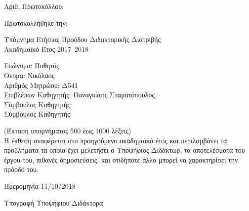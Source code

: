 \documentclass[a4paper]{article}
\begin{document}

Αριθ. Πρωτοκόλλου:

Πρωτοκολλήθηκε την:

Υπόμνημα Ετήσιας Προόδου Διδακτορικής Διατριβής \\
Ακαδημαϊκό Έτος 2017–2018

Επώνυμο: Ποθητός \\
Ονομα: Νικόλαος \\
Αριθμός Μητρώου: Δ541 \\
Επιβλέπων Καθηγητής: Παναγιώτης Σταματόπουλος \\
Σύμβουλος Καθηγητής: \\
Σύμβουλος Καθηγητής:

(Έκταση υπομνήματος 500 έως 1000 λέξεις) \\
Η έκθεση αναφέρεται στο προηγούμενο ακαδημαϊκό έτος και περιλαμβάνει τα προβλήματα τα οποία έχει μελετήσει ο Υποψήφιος Διδάκτωρ, τα αποτελέσματα του έργου του, πιθανές δημοσιεύσεις, και οτιδήποτε άλλο μπορεί να χαρακτηρίσει την πρόοδό του.

Ημερομηνία 11/10/2018

Υπογραφή Υποψήφιου Διδάκτορα
\end{document}

